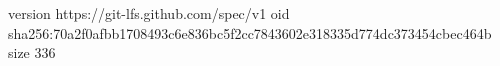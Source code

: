 version https://git-lfs.github.com/spec/v1
oid sha256:70a2f0afbb1708493c6e836bc5f2cc7843602e318335d774dc373454cbec464b
size 336
